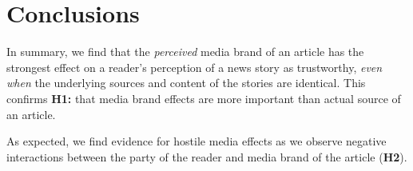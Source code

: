 





 

 

\section{Conclusions}
In summary, we find that the \emph{perceived} media brand of an article has the strongest effect on a reader's perception of a news story as trustworthy, \emph{even when} the underlying sources and content of the stories are identical. This confirms \textbf{H1:} that media brand effects are more important than actual source of an article. 

As expected, we find evidence for hostile media effects as we observe negative interactions between the party of the reader and media brand of the article (\textbf{H2}).

